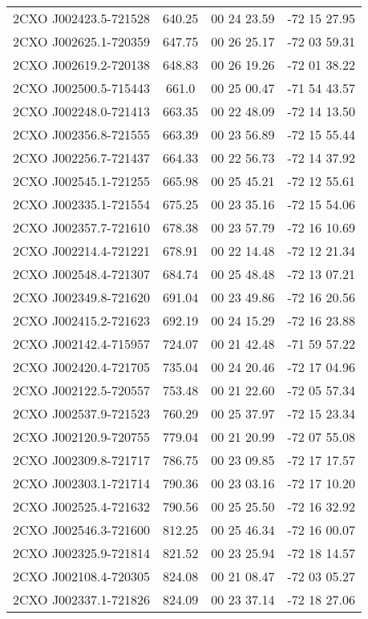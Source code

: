 \begin{table}
\begin{tabular}{cccc}
2CXO J002423.5-721528 & 640.25 & 00 24 23.59 & -72 15 27.95 \\
2CXO J002625.1-720359 & 647.75 & 00 26 25.17 & -72 03 59.31 \\
2CXO J002619.2-720138 & 648.83 & 00 26 19.26 & -72 01 38.22 \\
2CXO J002500.5-715443 & 661.0 & 00 25 00.47 & -71 54 43.57 \\
2CXO J002248.0-721413 & 663.35 & 00 22 48.09 & -72 14 13.50 \\
2CXO J002356.8-721555 & 663.39 & 00 23 56.89 & -72 15 55.44 \\
2CXO J002256.7-721437 & 664.33 & 00 22 56.73 & -72 14 37.92 \\
2CXO J002545.1-721255 & 665.98 & 00 25 45.21 & -72 12 55.61 \\
2CXO J002335.1-721554 & 675.25 & 00 23 35.16 & -72 15 54.06 \\
2CXO J002357.7-721610 & 678.38 & 00 23 57.79 & -72 16 10.69 \\
2CXO J002214.4-721221 & 678.91 & 00 22 14.48 & -72 12 21.34 \\
2CXO J002548.4-721307 & 684.74 & 00 25 48.48 & -72 13 07.21 \\
2CXO J002349.8-721620 & 691.04 & 00 23 49.86 & -72 16 20.56 \\
2CXO J002415.2-721623 & 692.19 & 00 24 15.29 & -72 16 23.88 \\
2CXO J002142.4-715957 & 724.07 & 00 21 42.48 & -71 59 57.22 \\
2CXO J002420.4-721705 & 735.04 & 00 24 20.46 & -72 17 04.96 \\
2CXO J002122.5-720557 & 753.48 & 00 21 22.60 & -72 05 57.34 \\
2CXO J002537.9-721523 & 760.29 & 00 25 37.97 & -72 15 23.34 \\
2CXO J002120.9-720755 & 779.04 & 00 21 20.99 & -72 07 55.08 \\
2CXO J002309.8-721717 & 786.75 & 00 23 09.85 & -72 17 17.57 \\
2CXO J002303.1-721714 & 790.36 & 00 23 03.16 & -72 17 10.20 \\
2CXO J002525.4-721632 & 790.56 & 00 25 25.50 & -72 16 32.92 \\
2CXO J002546.3-721600 & 812.25 & 00 25 46.34 & -72 16 00.07 \\
2CXO J002325.9-721814 & 821.52 & 00 23 25.94 & -72 18 14.57 \\
2CXO J002108.4-720305 & 824.08 & 00 21 08.47 & -72 03 05.27 \\
2CXO J002337.1-721826 & 824.09 & 00 23 37.14 & -72 18 27.06 \\

\end{tabular}
\end{table}
